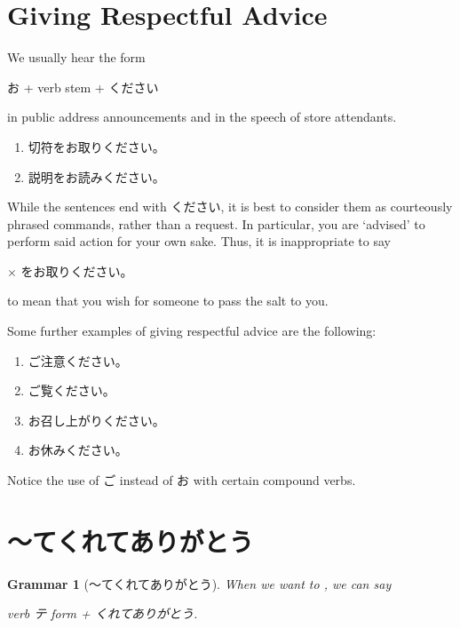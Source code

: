 \documentclass[notoc,notitlepage]{tufte-book}
\newtheorem{grammar}{\faBook Grammar}
\begin{document}

\section{Giving Respectful Advice}%
\label{sec:giving_respectful_advice}

We usually hear the form
\begin{center}
  お + verb stem + ください
\end{center}
in public address announcements and in the speech of store attendants.

\begin{eg}
  \begin{enumerate}
    \item 切符をお取りください。
    \item 説明をお読みください。
  \end{enumerate}
\end{eg}

While the sentences end with ください,
it is best to consider them as courteously phrased commands,
rather than a request.
In particular, you are `advised' to perform said action for your own sake.
Thus, it is inappropriate to say
\begin{center}
  $\times$ をお取りください。
\end{center}
to mean that you wish for someone to pass the salt to you.

\begin{eg}
  Some further examples of giving respectful advice are the following:
  \begin{enumerate}
    \item ご注意ください。
    \item ご覧ください。
    \item お召し上がりください。
    \item お休みください。
  \end{enumerate}
  Notice the use of ご instead of お with certain compound verbs.
\end{eg}


\section{〜てくれてありがとう}%
\label{sec:_tekuretearigatou}

\begin{grammar}[〜てくれてありがとう]\label{grammar:_tekuretearigatou}
  When we want to ,
  we can say
  \begin{center}
    verb テ form + くれてありがとう.
  \end{center}
\end{grammar}
\end{document}
